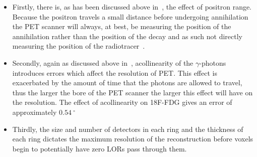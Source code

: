                 \begin{itemize}
                    \item Firstly, there is, as has been discussed above in~, the effect of positron range. Because the positron travels a small distance before undergoing annihilation the \gls{PET} scanner will always, at best, be measuring the position of the annihilation rather than the position of the decay and as such not directly measuring the position of the radiotracer~\parencite{PositronRangeLevinHoffmanBib}.

                    \item Secondly, again as discussed above in~, acollinearity of the $\gamma$-photons introduces errors which affect the resolution of \gls{PET}. %
                    This effect is exacerbated by the amount of time that the photons are allowed to travel, thus the larger the bore of the \gls{PET} scanner the larger this effect will have on the resolution. The effect of acollinearity on \gls{18F-FDG} gives an error of approximately $\SI{0.54}{^{\circ}}$~\parencite{AccollinearityBib}
                    
                    \item Thirdly, the size and number of detectors in each ring and the thickness of each ring dictates the maximum resolution of the reconstruction before voxels begin to potentially have zero \glspl{LOR} pass through them. %
                    

\end{itemize}
